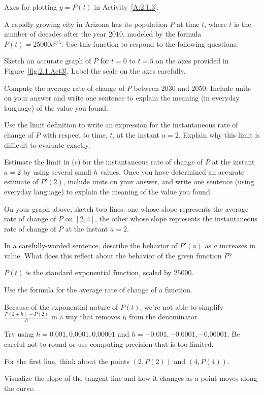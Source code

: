 \begin{marginfigure}[1cm]
\caption{Axes for plotting $y = P(t)$ in Activity~\ref{A:2.1.3}.} \label{fig:2.1.Act3}
\end{marginfigure}

\begin{activity}  \label{A:2.1.3}
A rapidly growing city in Arizona has its population $P$ at time $t$, where $t$ is the number of decades after the year $2010$, modeled by the formula $P(t) = 25000 e^{t/5}$.  Use this function to respond to the following questions.
\ba
	\item Sketch an accurate graph of $P$ for $t = 0$ to $t = 5$ on the axes provided in Figure~\ref{fig:2.1.Act3}.  Label the scale on the axes carefully.
	
	\item Compute the average rate of change of $P$ between $2030$ and $2050$.  Include units on your answer and write one sentence to explain the meaning (in everyday language) of the value you found.
	\item Use the limit definition to write an expression for the instantaneous rate of change of $P$ with respect to time, $t$, at the instant $a = 2$.  Explain why this limit is difficult to evaluate exactly.  
	\item Estimate the limit in (c) for the instantaneous rate of change of $P$ at the instant $a = 2$ by using several small $h$ values.  Once you have determined an accurate estimate of $P'(2)$, include units on your answer, and write one sentence (using everyday language) to explain the meaning of the value you found.
	\item On your graph above, sketch two lines:  one whose slope represents the average rate of change of $P$ on $[2,4]$, the other whose slope represents the instantaneous rate of change of $P$ at the instant $a=2$.
	\item In a carefully-worded sentence, describe the behavior of $P'(a)$ as $a$ increases in value.  What does this reflect about the behavior of the given function $P$?
\ea
\end{activity}
\begin{smallhint}
\ba
	\item $P(t)$ is the standard exponential function, scaled by $25000$.
	\item Use the formula for the average rate of change of a function.
	\item Because of the exponential nature of $P(t)$, we're not able to simplify $\frac{P(2+h)-P(2)}{h}$ in a way that removes $h$ from the denominator.  
	\item Try using $h = 0.001, 0.0001, 0.00001$ and $h = -0.001, -0.0001, -0.00001$.  Be careful not to round or use computing precision that is too limited.  
	\item For the first line, think about the points $(2,P(2))$ and $(4,P(4))$.
	\item Visualize the slope of the tangent line and how it changes as a point moves along the curve.
\ea
\end{smallhint}
